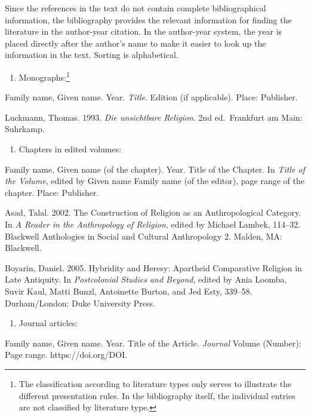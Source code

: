 \documentclass[
  english,
]{scrreprt}
\providecommand{\tightlist}{%
  \setlength{\itemsep}{0pt}\setlength{\parskip}{0pt}}
\begin{document}
Since the references in the text do not contain complete bibliographical information, the bibliography provides the relevant information for finding the literature in the author-year citation. In the author-year system, the year is placed directly after the author’s name to make it easier to look up the information in the text. Sorting is alphabetical.

\begin{enumerate}
\def\labelenumi{\alph{enumi})}
\tightlist
\item
  Monographs:\footnote{The classification according to literature types only serves to illustrate the different presentation rules. In the bibliography itself, the individual entries are not classified by literature type.}
\end{enumerate}

Family name, Given name. Year. \emph{Title}. Edition (if applicable). Place: Publisher.

Luckmann, Thomas. 1993. \emph{Die unsichtbare Religion}. 2nd ed.~Frankfurt am Main: Suhrkamp.

\begin{enumerate}
\def\labelenumi{\alph{enumi})}
\setcounter{enumi}{1}
\tightlist
\item
  Chapters in edited volumes:
\end{enumerate}

Family name, Given name (of the chapter). Year. Title of the Chapter. In \emph{Title of the Volume}, edited by Given name Family name (of the editor), page range of the chapter. Place: Publisher.

Asad, Talal. 2002. The Construction of Religion as an Anthropological Category. In \emph{A Reader in the Anthropology of Religion}, edited by Michael Lambek, 114–32. Blackwell Anthologies in Social and Cultural Anthropology 2. Malden, MA: Blackwell.

Boyarin, Daniel. 2005. Hybridity and Heresy: Apartheid Comparative Religion in Late Antiquity. In \emph{Postcolonial Studies and Beyond}, edited by Ania Loomba, Suvir Kaul, Matti Bunzl, Antoinette Burton, and Jed Esty, 339–58. Durham/London: Duke University Press.

\begin{enumerate}
\def\labelenumi{\alph{enumi})}
\setcounter{enumi}{2}
\tightlist
\item
  Journal articles:
\end{enumerate}

Family name, Given name. Year. Title of the Article. \emph{Journal} Volume (Number): Page range. https://doi.org/DOI.
\end{document}
